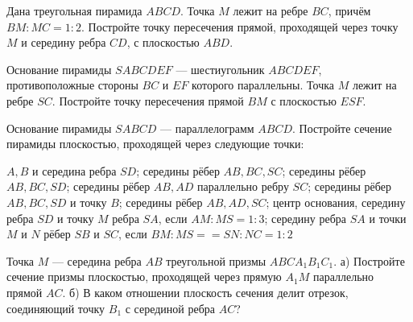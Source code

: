 \begin{homework}[number=1]
	\begin{listofex}
		\item Дана треугольная пирамида \(ABCD\). Точка \(M\) лежит на ребре \(BC\), причём \(BM:MC = 1:2\). Постройте точку пересечения прямой, проходящей через точку \(M\) и середину ребра \(CD\), с плоскостью \(ABD\).
		\item Основание пирамиды \(SABCDEF\) --- шестиугольник \(ABCDEF\), противоположные стороны \(BC\) и \(EF\) которого параллельны. Точка \(M\) лежит на ребре \(SC\). Постройте точку пересечения прямой \(BM\) с плоскостью \(ESF\).
		\item Основание пирамиды \(SABCD\) --- параллелограмм \(ABCD\). Постройте сечение пирамиды плоскостью, проходящей через следующие точки:
		\begin{itasks}[1]
			\task \(A, B\) и середина ребра \(SD\);
			\task середины рёбер \(AB, BC, SC\);
			\task середины рёбер \(AB, BC, SD\);
			\task середины рёбер \(AB, AD\) параллельно ребру \(SC\);
			\task середины рёбер \(AB, BC, SD\) и точку \(B\);
			\task середины рёбер \(AB, AD, SC\);
			\task центр основания, середину ребра \(SD\) и точку \(M\) ребра \(SA\), если \(AM:MS = 1:3\);
			\task середину ребра \(SA\) и точки \(M\) и \(N\) рёбер \(SB\) и \(SC\), если \(BM : MS = = SN :NC=1:2\)
		\end{itasks}
		\item Точка \(M\) — середина ребра \(AB\) треугольной призмы \(ABCA_1B_1C_1\). а) Постройте сечение призмы плоскостью, проходящей через прямую \(A_1M\) параллельно прямой \(AC\). б) В каком отношении плоскость сечения делит отрезок, соединяющий точку \(B_1\) с серединой ребра \(AC\)?
	\end{listofex}
\end{homework}

